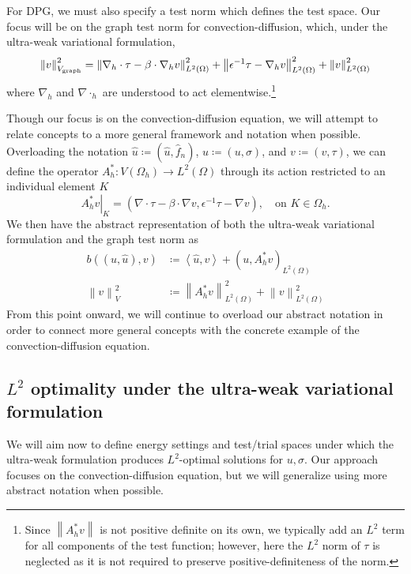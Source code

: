 \documentclass[11pt,onecolumn]{scrartcl}
\newcommand{\nor}[1]{\left\| #1 \right\|}
\newcommand{\LRp}[1]{\left( #1 \right)}
\newcommand{\LRa}[1]{\left\langle #1 \right\rangle}
\newcommand{\uh}{\widehat{u}}
\newcommand{\fnh}{\widehat{f}_n}
\renewcommand{\L}{L^2\LRp{\Omega}}
\newcommand{\Oh}{\Omega_h}
\newcommand{\grad}{\nabla}
\renewcommand{\div}{\grad \cdot}
\begin{document}
For DPG, we must also specify a test norm which defines the test space.  Our focus will be on the graph test norm for convection-diffusion, which, under the ultra-weak variational formulation, 
\[
\nor{v}_{V_{\rm graph}}^2 = \nor{\grad_h\cdot\tau - \beta \cdot \grad_h v}_{L^2(\Omega)}^2 + \nor{{\epsilon}^{-1} \tau -  \grad_h v}_{L^2(\Omega)}^2 + \nor{v}_{L^2(\Omega)}^2
\]
where $\grad_h$ and $\div_h$ are understood to act elementwise.\footnote{Since $\nor{A^*_hv}$ is not positive definite on its own, we typically add an $L^2$ term for all components of the test function; however, here the $L^2$ norm of $\tau$ is neglected as it is not required to preserve positive-definiteness of the norm.}

Though our focus is on the convection-diffusion equation, we will attempt to relate concepts to a more general framework and notation when possible.  Overloading the notation $\uh \coloneqq \LRp{\uh,\fnh}$, $u \coloneqq \LRp{u,\sigma}$, and $v \coloneqq \LRp{v,\tau}$, we can define the operator $A_h^*: V(\Oh)\rightarrow \L$ through its action restricted to an individual element $K$
\[
\left.A_h^*v\right|_K = \LRp{\div\tau - \beta \cdot \grad v, {\epsilon}^{-1} \tau -  \grad v}, \quad \text{on } K \in \Oh.
\]
We then have the abstract representation of both the ultra-weak variational formulation and the graph test norm as
\begin{align*}
b\LRp{\LRp{u,\uh},v} &\coloneqq \LRa{\uh,v} + \LRp{u,A^*_h v}_{\L} \\
\nor{v}_V^2 &\coloneqq \nor{A_h^*v}_{\L}^2 + \nor{v}_{\L}^2
\end{align*}
From this point onward, we will continue to overload our abstract notation in order to connect more general concepts with the concrete example of the convection-diffusion equation.

\subsection{$L^2$ optimality under the ultra-weak variational formulation}
We will aim now to define energy settings and test/trial spaces under which the ultra-weak formulation produces $L^2$-optimal solutions for $u,\sigma$.  Our approach focuses on the convection-diffusion equation, but we will generalize using more abstract notation when possible.  
\end{document}
